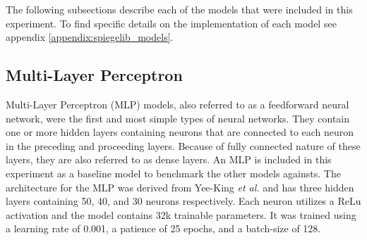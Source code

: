 The following subsections describe each of the models that were included in this experiment. To find specific details on the implementation of each model see appendix \ref{appendix:spiegelib_models}.


\subsection{Multi-Layer Perceptron}
Multi-Layer Perceptron (MLP) models, also referred to as a feedforward neural network, were the first and most simple types of neural networks. They contain one or more hidden layers containing neurons that are connected to each neuron in the preceding and proceeding layers. Because of fully connected nature of these layers, they are also referred to as dense layers. An MLP is included in this experiment as a baseline model to benchmark the other models againsts. The architecture for the MLP was derived from Yee-King \textit{et al.} \cite{yee2018automatic} and has three hidden layers containing 50, 40, and 30 neurons respectively. Each neuron utilizes a ReLu activation and the model contains 32k trainable parameters. It was trained using a learning rate of 0.001, a patience of 25 epochs, and a batch-size of 128.

